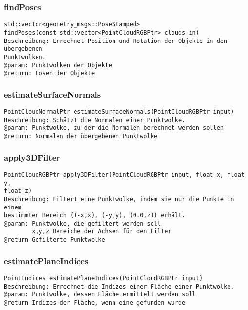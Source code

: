 \documentclass{suturo}
\begin{document}
\subsubsection{findPoses}
\begin{verbatim}
std::vector<geometry_msgs::PoseStamped> 
findPoses(const std::vector<PointCloudRGBPtr> clouds_in)
Beschreibung: Errechnet Position und Rotation der Objekte in den übergebenen
Punktwolken.
@param: Punktwolken der Objekte
@return: Posen der Objekte
\end{verbatim}\label{func:findposes}

\subsubsection{estimateSurfaceNormals}
\begin{verbatim}
PointCloudNormalPtr estimateSurfaceNormals(PointCloudRGBPtr input)
Beschreibung: Schätzt die Normalen einer Punktwolke.
@param: Punktwolke, zu der die Normalen berechnet werden sollen
@return: Normalen der übergebenen Punktwolke
\end{verbatim}\label{func:estimatesurfacenormals}

\subsubsection{apply3DFilter}
\begin{verbatim}
PointCloudRGBPtr apply3DFilter(PointCloudRGBPtr input, float x, float y, 
float z)
Beschreibung: Filtert eine Punktwolke, indem sie nur die Punkte in einem
bestimmten Bereich ((-x,x), (-y,y), (0.0,z)) erhält.
@param: Punktwolke, die gefiltert werden soll
		x,y,z Bereiche der Achsen für den Filter
@return Gefilterte Punktwolke
\end{verbatim}\label{func:apply3dfilter}

\subsubsection{estimatePlaneIndices}
\begin{verbatim}
PointIndices estimatePlaneIndices(PointCloudRGBPtr input)
Beschreibung: Errechnet die Indizes einer Fläche einer Punktwolke.
@param: Punktwolke, dessen Fläche ermittelt werden soll
@return Indizes der Fläche, wenn eine gefunden wurde
\end{verbatim}\label{func:estimateplaneindices}
\end{document}
